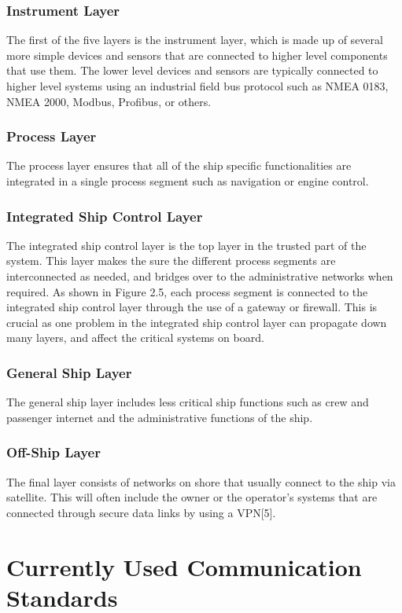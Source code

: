 \documentclass{report}
\begin{document}
\subsection{Instrument Layer}
The first of the five layers is the instrument layer, which is made up of several more simple devices and sensors that are connected to higher level components that use them. The lower level devices and sensors are typically connected to higher level systems using an industrial field bus protocol such as NMEA 0183, NMEA 2000, Modbus, Profibus, or others.

\subsection{Process Layer}
The process layer ensures that all of the ship specific functionalities are integrated in a single process segment such as navigation or engine control.
\subsection{Integrated Ship Control Layer}
The integrated ship control layer is the top layer in the trusted part of the system. This layer makes the sure the different process segments are interconnected as needed, and bridges over to the administrative networks when required. As shown in Figure 2.5, each process segment is connected to the integrated ship control layer through the use of a gateway or firewall. This is crucial as one problem in the integrated ship control layer can propagate down many layers, and affect the critical systems on board.
\subsection{General Ship Layer}
The general ship layer includes less critical ship functions such as crew and passenger internet and the administrative functions of the ship. 
\subsection{Off-Ship Layer}
The final layer consists of networks on shore that usually connect to the ship via satellite. This will often include the owner or the operator's systems that are connected through secure data links by using a VPN[5]. 


\chapter{Currently Used Communication Standards}
\end{document}
